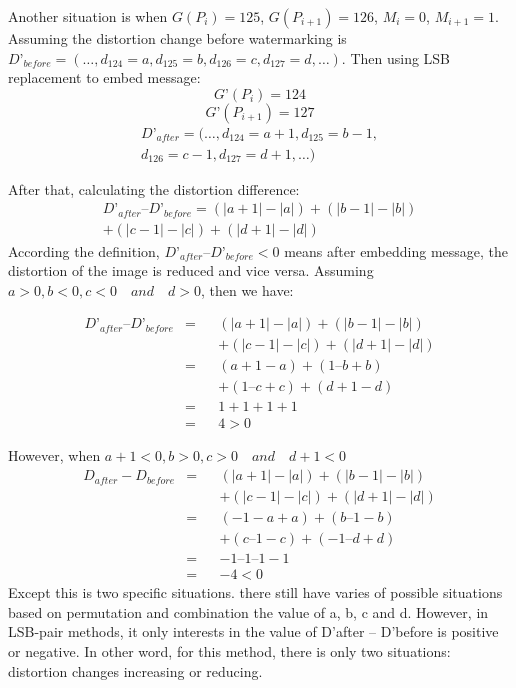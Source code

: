 \documentclass[%
    reprint,
    amsmath,amssymb,
    aps,
   ]{revtex4-1}
\begin{document}
   Another situation is when \(G(P_{i}) = 125\), \(G(P_{i+1}) = 126\), \(M_{i} = 0\), \(M_{i+1} = 1\). Assuming the distortion change before watermarking is \(D’_{before} = (…, d_{124} = a, d_{125} = b, d_{126} = c, d_{127} = d, …)\). Then using LSB replacement to embed message: 
   \[G’(P_{i}) = 124\] 
   \[G’(P_{i+1}) = 127\]
   \begin{multline*}
   D’_{after} = (…, d_{124} = a + 1, d_{125} = b - 1, \\
               d_{126} = c - 1, d_{127} = d + 1, …)
   \end{multline*}
   
   After that, calculating the distortion difference: 
   \begin{multline*}
   D’_{after} – D’_{before} = (|a + 1| - |a|) + (|b - 1| - |b|)\\
                   + (|c - 1| - |c|) + (|d + 1| - |d|)
   \end{multline*}
   According the definition, \(D’_{after} – D’_{before} < 0\) means after embedding message, the distortion of the image is reduced and vice versa. Assuming \(a > 0, b < 0, c < 0 \quad and \quad d > 0\), then we have:
   
   \begin{align*} 
   D’_{after} – D’_{before}    &= & &(|a + 1| - |a|) + (|b - 1| - |b|)\\
                               &  & &+ (|c - 1| - |c|) + (|d + 1| - |d|)\\
                               &= & &(a + 1 - a) + (1 – b + b) \\
                               &  & &+ (1 – c + c) + (d + 1 - d)\\
                               &= & &1 + 1+ 1+ 1\\
                               &= & &4 > 0
   \end{align*}
   
   However, when \(a + 1 < 0, b > 0, c > 0 \quad and \quad d + 1 < 0\)
   \begin{align*} 
   D_{after} - D_{before}  &= & &(|a + 1| - |a|) + (|b - 1| - |b|)\\
                           &  & &+(|c - 1| - |c|) + (|d + 1| - |d|)\\
                           &= & &( - 1 - a + a) + (b – 1 - b)\\
                           &  & &+ (c – 1 - c) + ( - 1 – d + d)\\
                           &= & &- 1 – 1 – 1 - 1\\
                           &= & &-4 < 0
   \end{align*}
   Except this is two specific situations. there still have varies of possible situations based on permutation and combination the value of a, b, c and d. However, in LSB-pair methods, it only interests in the value of D’after – D’before is positive or negative.  In other word, for this method, there is only two situations: distortion changes increasing or reducing. 
   
\end{document}
